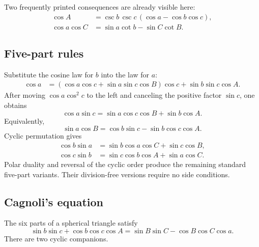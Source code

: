 Two frequently printed consequences are already visible here:
\begin{align}
 \cos A&=\csc b\,\csc c\,(\cos a-\cos b\cos c),           \tag{8.2}\\
 \cos a\cos C&=\sin a\cot b-\sin C\cot B.                 \tag{8.3}
\end{align}

\subsection{Five-part rules}

Substitute the cosine law for \(b\) into the law for \(a\):
\begin{align*}
 \cos a
 &=(\cos a\cos c+\sin a\sin c\cos B)\cos c
   +\sin b\sin c\cos A.
\end{align*}
After moving \(\cos a\cos^2c\) to the left and canceling the positive factor
\(\sin c\), one obtains
\begin{equation}
 \cos a\sin c
 =\sin a\cos c\cos B+\sin b\cos A.                         \tag{8.4}
\end{equation}
Equivalently,
\begin{equation}
 \sin a\cos B=\cos b\sin c-\sin b\cos c\cos A.            \tag{8.5}
\end{equation}
Cyclic permutation gives
\begin{align}
 \cos b\sin a&=\sin b\cos a\cos C+\sin c\cos B,          \tag{8.6}\\
 \cos c\sin b&=\sin c\cos b\cos A+\sin a\cos C.          \tag{8.7}
\end{align}
Polar duality and reversal of the cyclic order produce the remaining standard
five-part variants.  Their division-free versions require no side conditions.

\subsection{Cagnoli's equation}

\begin{theorem}[Cagnoli]
\label{thm:cagnoli}
The six parts of a spherical triangle satisfy
\begin{equation}
 \sin b\sin c+\cos b\cos c\cos A
 =\sin B\sin C-\cos B\cos C\cos a.                         \tag{8.8}
\end{equation}
There are two cyclic companions.
\end{theorem}

